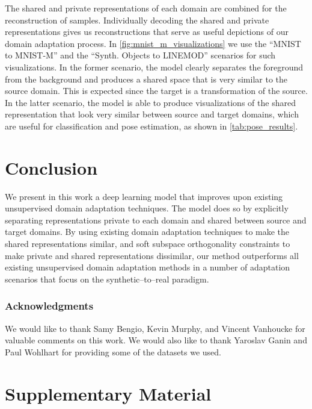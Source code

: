 \documentclass{article}
\begin{document}
The shared and private representations of each domain are combined for the reconstruction of samples. Individually decoding the shared and private representations gives us reconstructions that serve as useful depictions of our domain adaptation process. In \autoref{fig:mnist_m_visualizations} we use the ``MNIST to MNIST-M''  and the ``Synth. Objects to LINEMOD'' scenarios   for such visualizations.  In the former scenario, the model clearly separates the foreground from the background and produces a shared space that is very similar to the source domain. This is expected since the target is a transformation of the source. In the latter scenario, the model is able to produce visualizations of the shared representation that look very similar between source and target domains, which are useful for classification and pose estimation, as shown in \autoref{tab:pose_results}.
 \section{Conclusion}
\label{sec:conclusion}
\vspace{-4mm}
We present in this work a deep learning model that improves upon existing unsupervised domain adaptation techniques. The model does so by explicitly separating representations private to each domain and shared between source and target domains. By using existing domain adaptation techniques to make the shared representations similar, and soft subspace orthogonality constraints to make private and shared representations dissimilar, our method outperforms all existing unsupervised domain adaptation methods in a number of adaptation scenarios that focus on the synthetic--to--real paradigm. %
 
\subsubsection*{Acknowledgments}

We would like to thank Samy Bengio, Kevin Murphy, and Vincent Vanhoucke for valuable comments on this work. We would also like to thank Yaroslav Ganin and Paul Wohlhart for providing some of the datasets we used.

\clearpage
{
\small


}

\clearpage
\section*{Supplementary Material}
\appendix 
\end{document}
